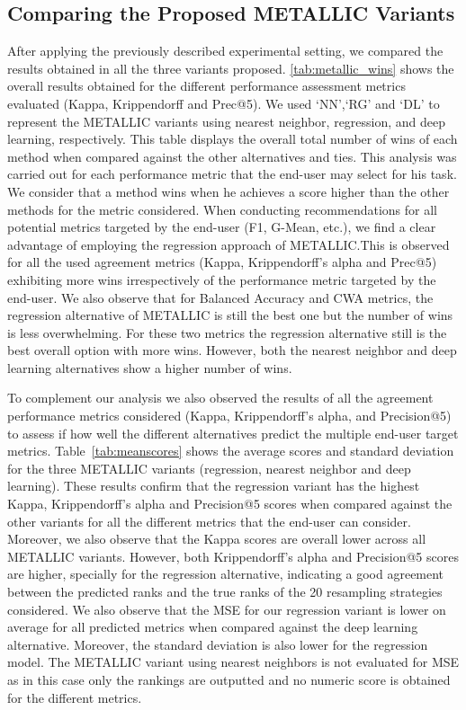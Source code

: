 \documentclass{article}
\begin{document}
\subsection{Comparing the Proposed METALLIC Variants}\label{sec:res1}
After applying the previously described experimental setting, we compared the results obtained in all the three variants proposed.
\autoref{tab:metallic_wins} shows the overall results obtained for the different performance assessment metrics evaluated (Kappa, Krippendorff and Prec@5). We used `NN',`RG' and `DL' to represent the METALLIC variants using nearest neighbor, regression, and deep learning, respectively. This table displays the overall total number of wins of each method when compared against the other alternatives and ties. This analysis was carried out for each performance metric that the end-user may select for his task. We consider that a method wins when he achieves a score higher than the other methods for the metric considered. When conducting recommendations for all potential metrics targeted by the end-user (F1, G-Mean, etc.), we find a clear advantage of employing the regression approach of METALLIC.\@ This is observed for all the used agreement metrics (Kappa, Krippendorff's alpha and Prec@5) exhibiting more wins irrespectively of the performance metric targeted by the end-user. We also observe that for Balanced Accuracy and CWA metrics, the regression alternative of METALLIC is still the best one but the number of wins is less overwhelming. For these two metrics the regression alternative still is the best overall option with more wins. However, both the nearest neighbor and deep learning alternatives show a higher number of wins.   

To complement our analysis we also observed the results of all the agreement performance metrics considered (Kappa, Krippendorff's alpha, and Precision@5) to assess if how well the different alternatives predict the multiple end-user target metrics. Table~\autoref{tab:meanscores} shows the average scores and standard deviation for the three METALLIC variants (regression, nearest neighbor and deep learning).
These results confirm that the regression variant has the highest Kappa, Krippendorff's alpha and Precision@5 scores when compared against the other variants for all the different metrics that the end-user can consider. Moreover, we also observe that the Kappa scores are overall lower across all METALLIC variants. However, both Krippendorff's alpha and Precision@5 scores are higher, specially for the regression alternative, indicating a good agreement between the predicted ranks and the true ranks of the 20 resampling strategies considered. We also observe that the MSE for our regression variant is lower on average for all predicted metrics when compared against the deep learning alternative. Moreover, the standard deviation is also lower for the regression model. The METALLIC variant using nearest neighbors is not evaluated for MSE as in this case only the rankings are outputted and no numeric score is obtained for the different metrics.  
\end{document}
